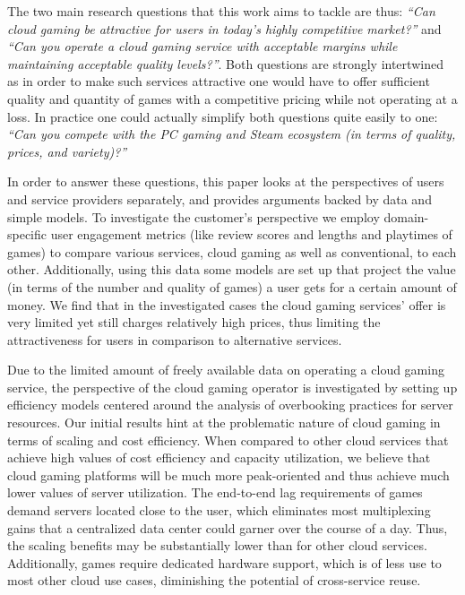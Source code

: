 The two main research questions that this work aims to tackle are thus: \textit{``Can cloud gaming be attractive for users in today's highly competitive market?''} and \textit{``Can you operate a cloud gaming service with acceptable margins while maintaining acceptable quality levels?''}. Both questions are strongly intertwined as in order to make such services attractive one would have to offer sufficient quality and quantity of games with a competitive pricing while not operating at a loss. In practice one could actually simplify both questions quite easily to one: \textit{``Can you compete with the PC gaming and Steam ecosystem (in terms of quality, prices, and variety)?''}

In order to answer these questions, this paper looks at the perspectives of users and service providers separately, and provides arguments backed by data and simple models. To investigate the customer's perspective we employ domain-specific user engagement metrics (like review scores and lengths and playtimes of games) to compare various services, cloud gaming as well as conventional, to each other. Additionally, using this data some models are set up that project the value (in terms of the number and quality of games) a user gets for a certain amount of money. We find that in the investigated cases the cloud gaming services' offer is very limited yet still charges relatively high prices, thus limiting the attractiveness for users in comparison to alternative services.

Due to the limited amount of freely available data on operating a cloud gaming service, the perspective of the cloud gaming operator is investigated by setting up efficiency models centered around the analysis of overbooking practices for server resources. Our initial results hint at the problematic nature of cloud gaming in terms of scaling and cost efficiency. When compared to other cloud services that achieve high values of cost efficiency and capacity utilization, we believe that cloud gaming platforms will be much more peak-oriented and thus achieve much lower values of server utilization. The end-to-end lag requirements of games demand servers located close to the user, which eliminates most multiplexing gains that a centralized data center could garner over the course of a day. Thus, the scaling benefits may be substantially lower than for other cloud services. Additionally, games require dedicated hardware support, which is of less use to most other cloud use cases, diminishing the potential of cross-service reuse.

